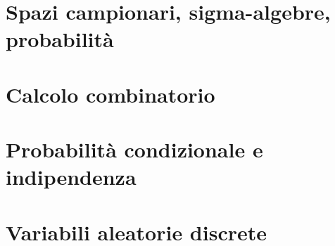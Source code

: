 \documentclass[11pt,a4paper,twoside,openright]{book}
\begin{document}



%           
%           
%           
%           
%           
%           
%           
%           
%           
%           


\chapter{Spazi campionari, sigma-algebre, probabilità}


\chapter{Calcolo combinatorio}


\chapter{Probabilità condizionale e indipendenza}


\chapter{Variabili aleatorie discrete}

\end{document}
